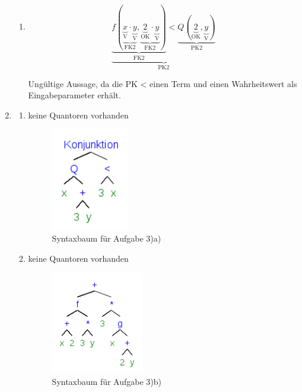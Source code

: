 \documentclass[a4paper]{article}
\begin{document}
\begin{enumerate}
\begin{enumerate}
			\item
			\begin{equation*}
				\underbrace{\underbrace{f(\underbrace{\underbrace{x}_{\text{V}} \cdot \underbrace{y}_{\text{V}}}_{\text{FK2}}, \underbrace{\underbrace{2}_{\text{OK}} \cdot \underbrace{y}_{\text{V}}}_{\text{FK2}})}_{\text{FK2}} < \underbrace{Q(\underbrace{2}_{\text{OK}}, \underbrace{y}_{\text{V}})}_{\text{PK2}}}_{\text{PK2}}
			\end{equation*}
			\begin{center}
				Ungültige Aussage, da die PK < einen Term und einen Wahrheitswert als Eingabeparameter erhält.
			\end{center}
		\end{enumerate}
		\clearpage
		
		\item
		\begin{enumerate}
			\item keine Quantoren vorhanden
			\begin{figure}[ht!]
				\begin{center}
					\includegraphics[height=45mm]{2a.png}
					\caption{Syntaxbaum für Aufgabe 3)a)}
				\end{center}
			\end{figure}
			
			\item keine Quantoren vorhanden
			\begin{figure}[ht!]
				\begin{center}
					\includegraphics[height=45mm]{2b.png}
					\caption{Syntaxbaum für Aufgabe 3)b)}
				\end{center}
			\end{figure}
			

\end{enumerate}
\end{enumerate}
\end{document}

